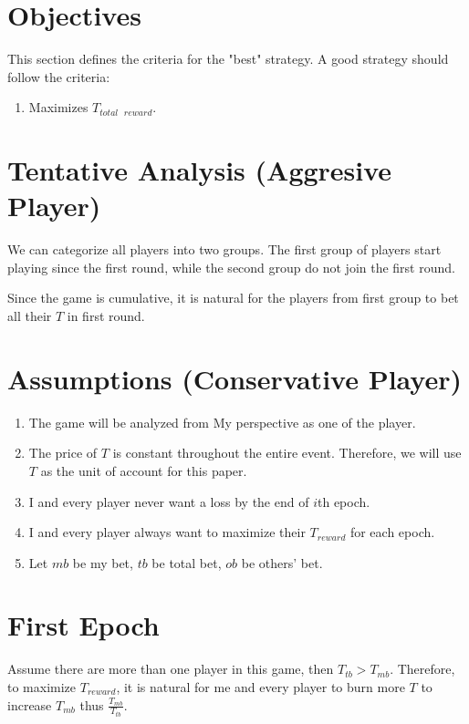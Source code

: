 \documentclass{article}
\begin{document}
\section*{Objectives}
This section defines the criteria for the "best" strategy. 
A good strategy should follow the criteria:
\begin{enumerate}
    \item Maximizes $T_{total \text{ }reward}$.
\end{enumerate}

\section*{Tentative Analysis (Aggresive Player)}
We can categorize all players into two groups.
The first group of players start playing since the first round, while the second group do not join the first round.

Since the game is cumulative, it is natural for the players from first group to bet all their $T$ in first round. 

\section*{Assumptions (Conservative Player)}
\begin{enumerate}
    \item The game will be analyzed from My perspective as one of the player.
    
    \item The price of $T$ is constant throughout the entire event. 
    Therefore, we will use $T$ as the unit of account for this paper.

    \item I and every player never want a loss by the end of $i$th epoch.
    
    \item I and every player always want to maximize their $T_{reward}$ for each epoch.
    
    \item Let $mb$ be my bet, $tb$ be total bet, $ob$ be others' bet.
\end{enumerate}

\section*{First Epoch}
Assume there are more than one player in this game, then $T_{tb} > T_{mb}$. 
Therefore, to maximize $T_{reward}$, it is natural for me and every player to burn more $T$ to increase $T_{mb}$ thus $\frac{T_{mb}}{T_{tb}}$.
\end{document}
